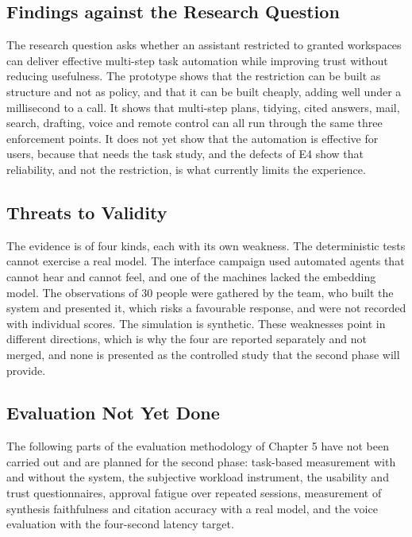 \documentclass{FastFyp}
\begin{document}
\subsection{Findings against the Research Question}
The research question asks whether an assistant restricted to granted workspaces can deliver effective multi-step task automation while improving trust without reducing usefulness. The prototype shows that the restriction can be built as structure and not as policy, and that it can be built cheaply, adding well under a millisecond to a call. It shows that multi-step plans, tidying, cited answers, mail, search, drafting, voice and remote control can all run through the same three enforcement points. It does not yet show that the automation is effective for users, because that needs the task study, and the defects of E4 show that reliability, and not the restriction, is what currently limits the experience.

\subsection{Threats to Validity}
The evidence is of four kinds, each with its own weakness. The deterministic tests cannot exercise a real model. The interface campaign used automated agents that cannot hear and cannot feel, and one of the machines lacked the embedding model. The observations of 30 people were gathered by the team, who built the system and presented it, which risks a favourable response, and were not recorded with individual scores. The simulation is synthetic. These weaknesses point in different directions, which is why the four are reported separately and not merged, and none is presented as the controlled study that the second phase will provide.

\subsection{Evaluation Not Yet Done}
The following parts of the evaluation methodology of Chapter 5 have not been carried out and are planned for the second phase: task-based measurement with and without the system, the subjective workload instrument, the usability and trust questionnaires, approval fatigue over repeated sessions, measurement of synthesis faithfulness and citation accuracy with a real model, and the voice evaluation with the four-second latency target.
\end{document}
